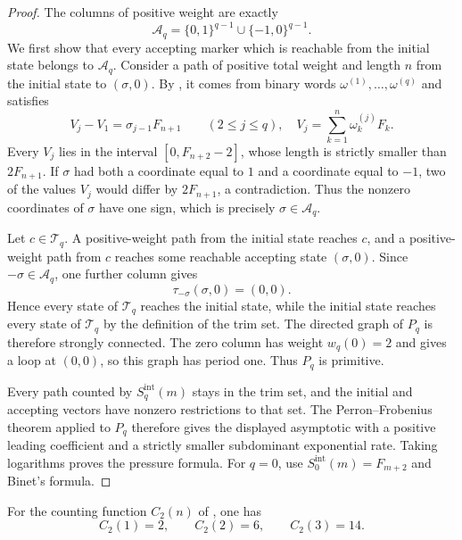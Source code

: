\begin{proof}
The columns of positive weight are exactly
\[
  \mathcal A_q
  =\{0,1\}^{q-1}\cup\{-1,0\}^{q-1}.
\]
We first show that every accepting marker which is reachable from the initial
state belongs to \(\mathcal A_q\).  Consider a path of positive total weight and
length \(n\) from the initial state to \((\sigma,0)\).  By
, it comes from binary words
\(\omega^{(1)},\ldots,\omega^{(q)}\) and satisfies
\[
  V_j-V_1=\sigma_{j-1}F_{n+1}\qquad(2\le j\le q),
  \quad
  V_j=\sum_{k=1}^n\omega_k^{(j)}F_k .
\]
Every \(V_j\) lies in the interval
\([0,F_{n+2}-2]\), whose length is strictly smaller than
\(2F_{n+1}\).  If \(\sigma\) had both a coordinate equal to \(1\) and a
coordinate equal to \(-1\), two of the values \(V_j\) would differ by
\(2F_{n+1}\), a contradiction.  Thus the nonzero coordinates of \(\sigma\)
have one sign, which is precisely \(\sigma\in\mathcal A_q\).

Let \(c\in\mathcal T_q\).  A positive-weight path from the initial state reaches
\(c\), and a positive-weight path from \(c\) reaches some reachable accepting
state \((\sigma,0)\).  Since
\(-\sigma\in\mathcal A_q\), one further column gives
\[
  \tau_{-\sigma}(\sigma,0)=(0,0).
\]
Hence every state of \(\mathcal T_q\) reaches the initial state, while the
initial state reaches every state of \(\mathcal T_q\) by the definition of the
trim set.  The directed graph of \(P_q\) is therefore strongly connected.  The
zero column has weight \(w_q(0)=2\) and gives a loop at \((0,0)\), so this graph
has period one.  Thus \(P_q\) is primitive.

Every path counted by \(S_q^{\mathrm{int}}(m)\) stays in the trim set, and the
initial and accepting vectors have nonzero restrictions to that set.  The
Perron--Frobenius theorem applied to \(P_q\) therefore gives the displayed
asymptotic with a positive leading coefficient and a strictly smaller
subdominant exponential rate.  Taking logarithms proves the pressure formula.
For \(q=0\), use
\(S_0^{\mathrm{int}}(m)=F_{m+2}\) and Binet's formula.
\end{proof}

\begin{lemma}
\label{lem:initial-second-moment-enumeration}
For the counting function \(C_2(n)\) of
, one has
\[
  C_2(1)=2,
  \qquad C_2(2)=6,
  \qquad C_2(3)=14 .
\]
\end{lemma}

